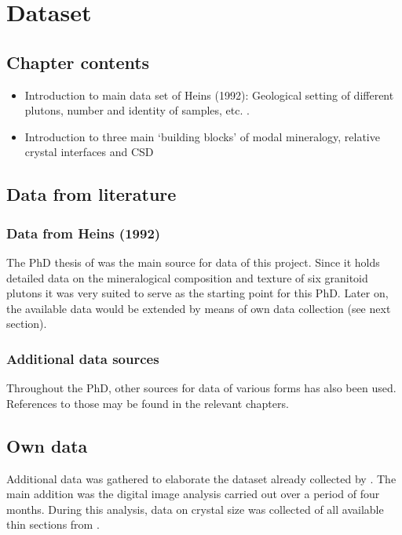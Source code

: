 \chapter{Dataset}\label{ch:dataset}

\section{Chapter contents}
\begin{itemize}
    \item Introduction to main data set of Heins (1992): Geological setting of different plutons, number and identity of samples, etc. . %
    \item Introduction to three main ‘building blocks’ of modal mineralogy, relative crystal interfaces and CSD
\end{itemize}

\section{Data from literature}
    \subsection{Data from Heins (1992)}
        The PhD thesis of \Textcite{Heins_1992} was the main source for data of this project. %
        Since it holds detailed data on the mineralogical composition and texture of six granitoid plutons it was very suited to serve as the starting point for this PhD. %
        Later on, the available data would be extended by means of own data collection (see next section). %

    \subsection{Additional data sources}
        Throughout the PhD, other sources for data of various forms has also been used. %
        References to those may be found in the relevant chapters. %

\section{Own data}
    Additional data was gathered to elaborate the dataset already collected by \Textcite{Heins_1992}. %
    The main addition was the digital image analysis carried out over a period of four months. %
    During this analysis, data on crystal size was collected of all available thin sections from \Textcite{Heins_1992}. %



\cleardoublepage

